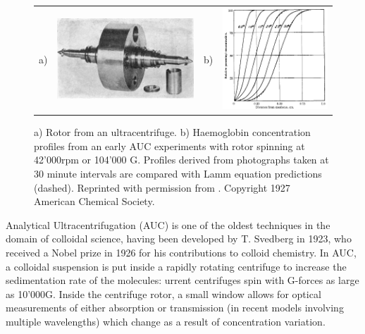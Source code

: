 \documentclass{doctoral}
\begin{document}
\begin{figure}[h]
    \centering
    \begin{tabular}{llll}
        a)                                                                                      &
        \includegraphics[height=0.3\linewidth,valign=t]{figures/ultracentrifugation_device.png} &
        b)                                                                                      &
        \includegraphics[height=0.3\linewidth,valign=t]{figures/ultracentrifugation_results.png}
    \end{tabular}

    \caption{a) Rotor from an ultracentrifuge. b) Haemoglobin concentration profiles from an early AUC experiments with rotor spinning at 42'000rpm or 104'000 G.
        Profiles derived from photographs taken at 30 minute intervals are compared with Lamm equation predictions (dashed).
        Reprinted with permission from \cite{Svedberg_1927}.
        Copyright 1927 American Chemical Society.
    }
    \label{fig:auc_diagram}
\end{figure}

Analytical Ultracentrifugation (AUC) is one of the oldest techniques in the domain of colloidal science, having been developed by T. Svedberg in 1923, who received a Nobel prize in 1926 for his contributions to colloid chemistry.
In AUC, a colloidal suspension is put inside a rapidly rotating centrifuge to increase the sedimentation rate of the molecules: urrent centrifuges spin with G-forces as large as 10'000G.
Inside the centrifuge rotor, a small window allows for optical measurements of either absorption or transmission (in recent models involving multiple wavelengths) which change as a result of concentration variation.
\end{document}
